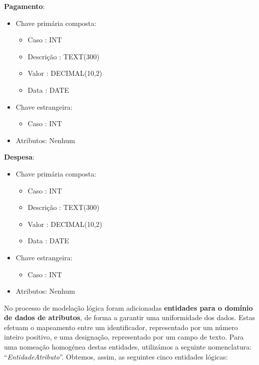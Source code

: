 \documentclass[a4paper,12pt]{scrreprt}
\begin{document}
        \textbf{Pagamento}:
        \begin{itemize}
            \item Chave primária composta:
                \begin{itemize}
                    \item Caso : INT
                    \item Descrição : TEXT(300)
                    \item Valor : DECIMAL(10,2)
                    \item Data : DATE
                \end{itemize}
            \item Chave estrangeira:
                \begin{itemize}
                    \item Caso : INT
                \end{itemize}
            \item Atributos: Nenhum
        \end{itemize}

        \vspace{0.5cm}

        \textbf{Despesa}:
        \begin{itemize}
            \item Chave primária composta:
                \begin{itemize}
                    \item Caso : INT
                    \item Descrição : TEXT(300)
                    \item Valor : DECIMAL(10,2)
                    \item Data : DATE
                \end{itemize}
            \item Chave estrangeira:
                \begin{itemize}
                    \item Caso : INT
                \end{itemize}
            \item Atributos: Nenhum
        \end{itemize}

        \clearpage

        No processo de modelação lógica foram adicionadas \textbf{entidades para o domínio de dados de atributos}, de forma a garantir uma uniformidade dos dados. Estas efetuam o mapeamento entre um identificador, representado por um número inteiro positivo, e uma designação, representado por um campo de texto. Para uma nomeação homogénea destas entidades, utilizámos a seguinte nomenclatura: “\textit{EntidadeAtributo}”. Obtemos, assim, as seguintes cinco entidades lógicas:
\end{document}
